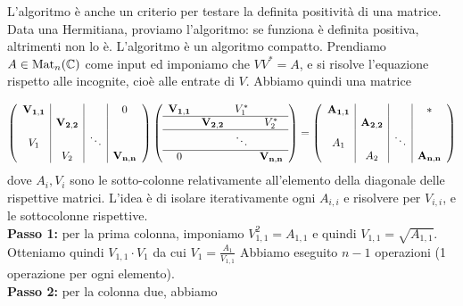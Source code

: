 \documentclass[a4paper]{article}
\begin{document}
\pagebreak

L'algoritmo è anche un criterio per testare la definita positività di una matrice.
Data una Hermitiana, proviamo l'algoritmo: se funziona è definita positiva, altrimenti non lo è.
L'algoritmo è un algoritmo compatto.
Prendiamo \(A \in \operatorname{Mat}_{n}(\mathbb{C})\)
come input ed imponiamo che \(VV^* = A\), e si risolve l'equazione
rispetto alle incognite, cioè alle entrate di \(V\).
Abbiamo quindi una matrice

\[
    \left(
        \begin{array}{c|c|c|c}
            \mathbf{V_{1,1}} &        &        & 0 \\
            & \mathbf{V_{2,2}} &       &   \\
            V_1     &      & \ddots &   \\
            &  V_2       &        & \mathbf{V_{n,n}}
        \end{array}
    \right)
    \left(
        \begin{array}{cccc}
            \mathbf{V_{1,1}} &   &    V_1^*     &   \\
            \hline
            & \mathbf{V_{2,2}} &  &  V_2^*  \\
            \hline
            &         & \ddots &   \\
            \hline
            0       &         &        & \mathbf{V_{n,n}}
        \end{array}
    \right)
    =
    \left(
        \begin{array}{c|c|c|c}
            \mathbf{A_{1,1}} &        &        & \ast \\
            & \mathbf{A_{2,2}} &       &      \\
            A_1     &      & \ddots &     \\
            &   A_2      &        & \mathbf{A_{n,n}}
        \end{array}
    \right)
\]
dove \(A_i,V_i\) sono le sotto-colonne relativamente all'elemento della diagonale
delle rispettive matrici. L'idea è di isolare iterativamente ogni \(A_{i,i}\)
e risolvere per \(V_{i,i}\), e le sottocolonne rispettive. \\
\textbf{Passo 1:} per la prima colonna, imponiamo \(V_{1,1}^2 = A_{1,1}\)
e quindi \(V_{1,1} = \sqrt{A_{1,1}}\).
Otteniamo quindi \(V_{1,1} \cdot V_1\)
da cui \(V_1 = \frac{A_1}{V_{1,1}}\)
Abbiamo eseguito \(n-1\) operazioni (1 operazione per ogni elemento). \\
\textbf{Passo 2:} per la colonna due, abbiamo
\end{document}
